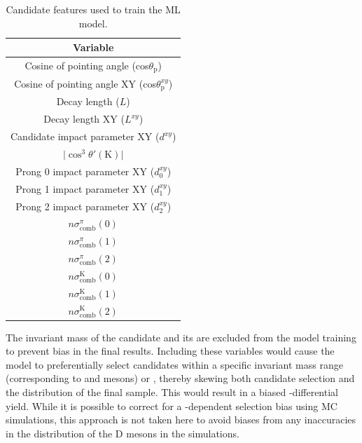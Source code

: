 \begin{table}[tb]
    \begin{center}
    \caption{Candidate features used to train the ML model.}
    \label{tab:ml_training_vars}
    \vspace*{0.3cm}
    \begin{tabular}{c}
         \toprule
         Variable\\
         \midrule         
         Cosine of pointing angle (cos$\theta_\mathrm{p}$)\\
         Cosine of pointing angle XY (cos$\theta_\mathrm{p}^{xy}$)\\
         Decay length ($L$)\\
         Decay length XY ($L^{xy}$)\\
         Candidate impact parameter XY ($d^{xy}$)\\
         $\lvert \cos^{3}\theta'(\mathrm K)\rvert$\\
         Prong 0 impact parameter XY ($d_{0}^{xy}$)\\
         Prong 1 impact parameter XY ($d_{1}^{xy}$)\\
         Prong 2 impact parameter XY ($d_{2}^{xy}$)\\
         $n\sigma_\mathrm{comb}^{\pi}(0)$\\         
         $n\sigma_\mathrm{comb}^{\pi}(1)$\\
         $n\sigma_\mathrm{comb}^{\pi}(2)$\\
         $n\sigma_\mathrm{comb}^{\mathrm K}(0)$\\
         $n\sigma_\mathrm{comb}^{\mathrm K}(1)$\\
         $n\sigma_\mathrm{comb}^{\mathrm K}(2)$\\
         \bottomrule
    \end{tabular}
    \end{center}
\end{table}

The invariant mass of the candidate and its \pt are excluded from the model training to prevent bias in the final results. Including these variables would cause the model to preferentially select candidates within a specific invariant mass range (corresponding to \ds and \dpl mesons) or \pt, thereby skewing both candidate selection and the \pt distribution of the final sample. This would result in a biased \pt-differential yield. While it is possible to correct for a \pt-dependent selection bias using MC simulations, this approach is not taken here to avoid biases from any inaccuracies in the \pt distribution of the D mesons in the simulations. 

